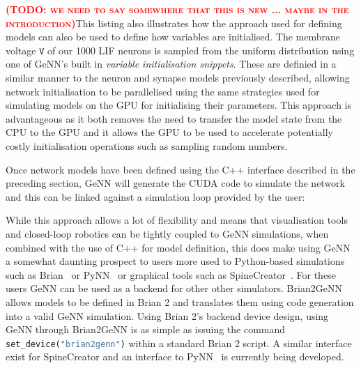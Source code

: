 \documentclass[utf8]{frontiersSCNS} %
\newcommand{\todo}[1]{\textbf{\textsc{\textcolor{red}{(TODO: #1)}}}}
\begin{document}
\todo{we need to say somewhere that this is new ... maybe in the introduction}This listing also illustrates how the approach used for defining models can also be used to define how variables are initialised.
The membrane voltage \lstinline{V} of our \num{1000} LIF neurons is sampled from the uniform distribution using one of GeNN's built in \textit{variable initialisation snippets}.
These are definied in a similar manner to the neuron and synapse models previously described, allowing network initialisation to be parallelised using the same strategies used for simulating models on the GPU for initialising their parameters.
This approach is advantageous as it both removes the need to transfer the model state from the CPU to the GPU and it allows the GPU to be used to accelerate potentially costly initialisation operations such as sampling random numbers.

Once network models have been defined using the C++ interface described in the preceding section, GeNN will generate the CUDA code to simulate the network and this can be linked against a simulation loop provided by the user:



While this approach allows a lot of flexibility and means that visualisation tools and closed-loop robotics can be tightly coupled to GeNN simulations, when combined with the use of C++ for model definition, this does make using GeNN a somewhat daunting prospect to users more used to Python-based simulations such as Brian~\citep{Stimberg2014} or PyNN~\citep{Davison2008a} or graphical tools such as SpineCreator~\citep{Cope2017}.
For these users GeNN can be used as a backend for other other simulators.
Brian2GeNN~\citep{Stimberg2018} allows models to be defined in Brian 2 and translates them using code generation into a valid GeNN simulation. 
Using Brian 2's backend device design, using GeNN through Brian2GeNN is as simple as issuing the command \lstinline[language=python]{set_device("brian2genn")} within a standard Brian 2 script. 
A similar interface exist for SpineCreator and an interface to PyNN~\citep{Davison2008a} is currently being developed.
\end{document}
